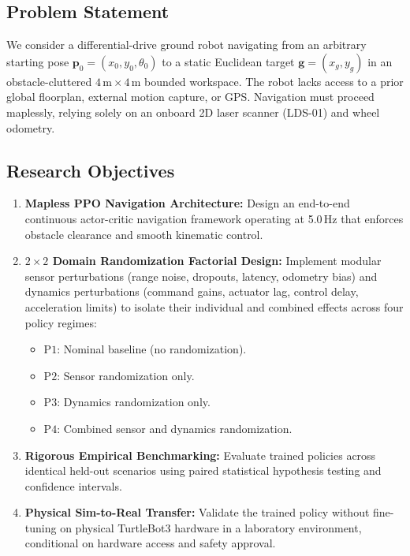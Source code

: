 \documentclass[conference]{IEEEtran}
\begin{document}
\subsection{Problem Statement}
We consider a differential-drive ground robot navigating from an arbitrary starting pose $\mathbf{p}_0 = (x_0, y_0, \theta_0)$ to a static Euclidean target $\mathbf{g} = (x_g, y_g)$ in an obstacle-cluttered $4\,\text{m} \times 4\,\text{m}$ bounded workspace. The robot lacks access to a prior global floorplan, external motion capture, or GPS. Navigation must proceed maplessly, relying solely on an onboard 2D laser scanner (LDS-01) and wheel odometry.

\subsection{Research Objectives}
\begin{enumerate}
    \item \textbf{Mapless PPO Navigation Architecture:} Design an end-to-end continuous actor-critic navigation framework operating at 5.0\,Hz that enforces obstacle clearance and smooth kinematic control.
    \item \textbf{$2 \times 2$ Domain Randomization Factorial Design:} Implement modular sensor perturbations (range noise, dropouts, latency, odometry bias) and dynamics perturbations (command gains, actuator lag, control delay, acceleration limits) to isolate their individual and combined effects across four policy regimes:
    \begin{itemize}
        \item $\text{P1}$: Nominal baseline (no randomization).
        \item $\text{P2}$: Sensor randomization only.
        \item $\text{P3}$: Dynamics randomization only.
        \item $\text{P4}$: Combined sensor and dynamics randomization.
    \end{itemize}
    \item \textbf{Rigorous Empirical Benchmarking:} Evaluate trained policies across identical held-out scenarios using paired statistical hypothesis testing and confidence intervals.
    \item \textbf{Physical Sim-to-Real Transfer:} Validate the trained policy without fine-tuning on physical TurtleBot3 hardware in a laboratory environment, conditional on hardware access and safety approval.
\end{enumerate}
\end{document}
